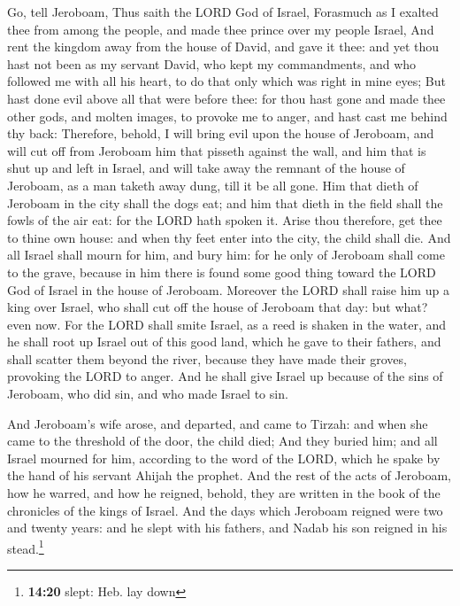  Go, tell Jeroboam, Thus saith the LORD God of Israel,
Forasmuch as I exalted thee from among the people, and made thee prince
over my people Israel,  And rent the kingdom away from the
house of David, and gave it thee: and yet thou hast not been as my
servant David, who kept my commandments, and who followed me with all
his heart, to do that only which was right in mine eyes; 
But hast done evil above all that were before thee: for thou hast gone
and made thee other gods, and molten images, to provoke me to anger, and
hast cast me behind thy back:  Therefore, behold, I will
bring evil upon the house of Jeroboam, and will cut off from Jeroboam
him that pisseth against the wall, and him that is shut up and left in
Israel, and will take away the remnant of the house of Jeroboam, as a
man taketh away dung, till it be all gone.  Him that
dieth of Jeroboam in the city shall the dogs eat; and him that dieth in
the field shall the fowls of the air eat: for the LORD hath spoken it.
 Arise thou therefore, get thee to thine own house: and
when thy feet enter into the city, the child shall die. 
And all Israel shall mourn for him, and bury him: for he only of
Jeroboam shall come to the grave, because in him there is found some
good thing toward the LORD God of Israel in the house of Jeroboam.
 Moreover the LORD shall raise him up a king over Israel,
who shall cut off the house of Jeroboam that day: but what? even now.
 For the LORD shall smite Israel, as a reed is shaken in
the water, and he shall root up Israel out of this good land, which he
gave to their fathers, and shall scatter them beyond the river, because
they have made their groves, provoking the LORD to anger.
 And he shall give Israel up because of the sins of
Jeroboam, who did sin, and who made Israel to sin.

 And Jeroboam's wife arose, and departed, and came to
Tirzah: and when she came to the threshold of the door, the child died;
 And they buried him; and all Israel mourned for him,
according to the word of the LORD, which he spake by the hand of his
servant Ahijah the prophet.  And the rest of the acts of
Jeroboam, how he warred, and how he reigned, behold, they are written in
the book of the chronicles of the kings of Israel.  And
the days which Jeroboam reigned were two and twenty years: and he slept
with his fathers, and Nadab his son reigned in his stead.\footnote{\textbf{14:20}
  slept: Heb. lay down}

